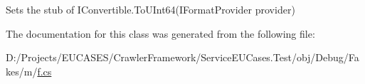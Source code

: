 Sets the stub of I\-Convertible.\-To\-U\-Int64(\-I\-Format\-Provider provider)



The documentation for this class was generated from the following file\-:\begin{DoxyCompactItemize}
\item 
D\-:/\-Projects/\-E\-U\-C\-A\-S\-E\-S/\-Crawler\-Framework/\-Service\-E\-U\-Cases.\-Test/obj/\-Debug/\-Fakes/m/\hyperlink{m_2f_8cs}{f.\-cs}\end{DoxyCompactItemize}
